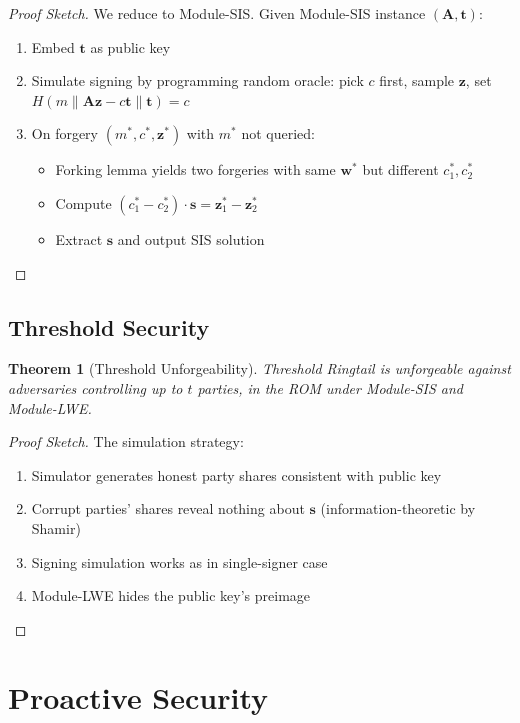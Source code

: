 \documentclass[11pt,a4paper]{article}
\newtheorem{theorem}{Theorem}[section]
\begin{document}
\begin{proof}[Proof Sketch]
We reduce to Module-SIS. Given Module-SIS instance $(\mathbf{A}, \mathbf{t})$:
\begin{enumerate}
    \item Embed $\mathbf{t}$ as public key
    \item Simulate signing by programming random oracle: pick $c$ first, sample $\mathbf{z}$, set $H(m \| \mathbf{A}\mathbf{z} - c\mathbf{t} \| \mathbf{t}) = c$
    \item On forgery $(m^*, c^*, \mathbf{z}^*)$ with $m^*$ not queried:
        \begin{itemize}
            \item Forking lemma yields two forgeries with same $\mathbf{w}^*$ but different $c^*_1, c^*_2$
            \item Compute $(c^*_1 - c^*_2) \cdot \mathbf{s} = \mathbf{z}^*_1 - \mathbf{z}^*_2$
            \item Extract $\mathbf{s}$ and output SIS solution
        \end{itemize}
\end{enumerate}
\end{proof}

\subsection{Threshold Security}

\begin{theorem}[Threshold Unforgeability]
Threshold Ringtail is unforgeable against adversaries controlling up to $t$ parties, in the ROM under Module-SIS and Module-LWE.
\end{theorem}

\begin{proof}[Proof Sketch]
The simulation strategy:
\begin{enumerate}
    \item Simulator generates honest party shares consistent with public key
    \item Corrupt parties' shares reveal nothing about $\mathbf{s}$ (information-theoretic by Shamir)
    \item Signing simulation works as in single-signer case
    \item Module-LWE hides the public key's preimage
\end{enumerate}
\end{proof}

\section{Proactive Security}
\end{document}
